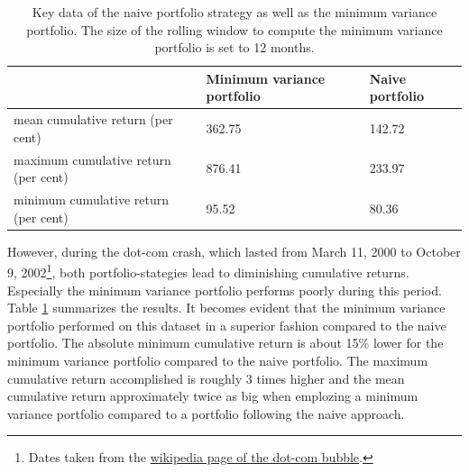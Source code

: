 \begin{table}[htbp]
  \begin{center}
    \begin{tabular}{|l|l|l|}
    \hline
     & Minimum variance portfolio & Naive portfolio \\ \hline
    mean cumulative return (per cent) & 362.75 & 142.72 \\ \hline
    maximum cumulative return (per cent) & 876.41 & 233.97 \\ \hline
    minimum cumulative return (per cent) & 95.52 & 80.36 \\ \hline
    \end{tabular}
  \end{center}
  \caption{Key data of the naive portfolio strategy as well as the minimum variance portfolio. The size of the rolling window to compute the minimum variance portfolio is set to 12 months.}
  \label{tab:portfolio-appreciation}
\end{table}

However, during the dot-com crash, which lasted from March 11, 2000 to October 9, 2002\footnote{Dates taken from the \href{https://en.wikipedia.org/wiki/Dot-com_bubble}{wikipedia page of the dot-com bubble}.}, both portfolio-stategies lead to diminishing cumulative returns. Especially the minimum variance portfolio performs poorly during this period.\\

Table \ref{tab:portfolio-appreciation} summarizes the results. It becomes evident that the minimum variance portfolio performed on this dataset in a superior fashion compared to the naive portfolio. The absolute minimum cumulative return is about 15\% lower for the minimum variance portfolio compared to the naive portfolio. The maximum cumulative return accomplished is roughly 3 times higher and the mean cumulative return approximately twice as big when emplozing a minimum variance portfolio compared to a portfolio following the naive approach.\\


